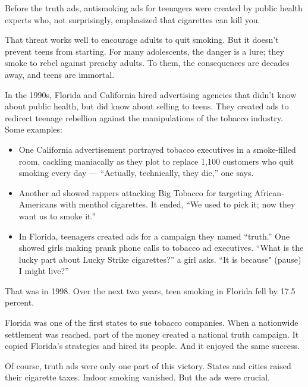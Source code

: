 Before the truth ads, antismoking ads for teenagers were created by
public health experts who, not surprisingly, emphasized that cigarettes
can kill you.

That threat works well to encourage adults to quit smoking. But it
doesn't prevent teens from starting. For many adolescents, the danger is
a lure; they smoke to rebel against preachy adults. To them, the
consequences are decades away, and teens are immortal.

In the 1990s, Florida and California hired advertising agencies that
didn't know about public health, but did know about selling to teens.
They created ads to redirect teenage rebellion against the manipulations
of the tobacco industry. Some examples:

\begin{itemize}
\tightlist
\item
  One California advertisement portrayed tobacco executives in a
  smoke-filled room, cackling maniacally as they plot to replace 1,100
  customers who quit smoking every day --- ``Actually, technically, they
  die,'' one says.
\end{itemize}

\begin{itemize}
\tightlist
\item
  Another ad showed rappers attacking Big Tobacco for targeting
  African-Americans with menthol cigarettes. It ended, ``We used to pick
  it; now they want us to smoke it.''
\end{itemize}

\begin{itemize}
\tightlist
\item
  In Florida, teenagers created ads for a campaign they named ``truth.''
  One showed girls making prank phone calls to tobacco ad executives.
  ``What is the lucky part about Lucky Strike cigarettes?'' a girl asks.
  ``It is because" (pause) I might live?''
\end{itemize}

That was in 1998. Over the next two years, teen smoking in Florida fell
by 17.5 percent.

Florida was one of the first states to sue tobacco companies. When a
nationwide settlement was reached, part of the money created a national
truth campaign. It copied Florida's strategies and hired its people. And
it enjoyed the same success.

Of course, truth ads were only one part of this victory. States and
cities raised their cigarette taxes. Indoor smoking vanished. But the
ads were crucial.

